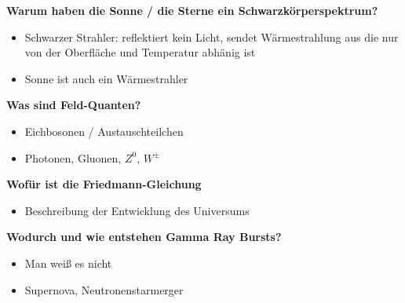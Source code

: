 \begin{frame}{}
  \textbf{Warum haben die Sonne / die Sterne ein Schwarzkörperspektrum?}
  \begin{itemize}
    \item Schwarzer Strahler: reflektiert kein Licht, sendet Wärmestrahlung aus die nur von der Oberfläche und Temperatur abhänig ist
    \item Sonne ist auch ein Wärmestrahler
  \end{itemize}
  \vspace{1em}
  \textbf{Was sind Feld-Quanten?}
  \begin{itemize}
    \item Eichbosonen / Austauschteilchen
    \item Photonen, Gluonen, $Z^0$, $W^\pm$
  \end{itemize}
  \vspace{1em}
  \textbf{Wofür ist die Friedmann-Gleichung}
  \begin{itemize}
    \item Beschreibung der Entwicklung des Universums
    \end{itemize}
    \vspace{1em}
    \textbf{Wodurch und wie entstehen Gamma Ray Bursts?}
    \begin{itemize}
      \item  Man weiß es nicht
      \item  Supernova, Neutronenstarmerger
    \end{itemize}
\end{frame}

